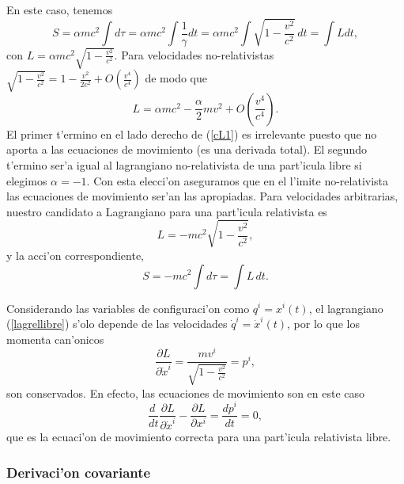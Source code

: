 En este caso, tenemos
\begin{equation}
S=\alpha mc^2\int  d\tau=\alpha mc^2\int \frac{1}{\gamma}dt=\alpha mc^2\int
\sqrt{1-\frac{v^2}{c^2}}\,dt=\int L dt, \label{lagrellibre0}
\end{equation}
con $L=\alpha mc^2 \sqrt{1-\frac{v^2}{c^2}}$.
Para velocidades no-relativistas $\sqrt{1-\frac{v^2}{c^2}}=1-\frac{v^2}{2c^2}+O(\frac{v^4}{c^4})$  de modo que
\begin{equation}
L=\alpha mc^2-\frac{\alpha}{2}mv^2+O(\frac{v^4}{c^4}). \label{cL1}
\end{equation}
El primer t'ermino en el lado derecho de (\ref{cL1}) es irrelevante puesto que no aporta a las ecuaciones de movimiento (es una derivada total). El segundo t'ermino ser'a igual al lagrangiano no-relativista de una part'icula libre si elegimos $\alpha=-1$. Con esta elecci'on aseguramos que en el l'imite no-relativista las ecuaciones de movimiento ser'an las apropiadas. Para velocidades arbitrarias, nuestro candidato a Lagrangiano para una part'icula relativista es
\begin{equation}
L=-mc^2 \sqrt{1-\frac{v^2}{c^2}},\label{lagrellibre}
\end{equation}
y la acci'on correspondiente,
\begin{equation}
\boxed{S=- mc^2\int  d\tau=\int L\, dt.}
\end{equation}

Considerando las variables de configuraci'on como $q^i=x^i(t)$, el lagrangiano (\ref{lagrellibre}) s'olo depende de las velocidades $\dot{q}^i=\dot{x}^i(t)$, por lo que los momenta can'onicos
\begin{equation}
\frac{\partial L}{\partial \dot{x}^i}=\frac{mv^i}{\sqrt{1-\frac{v^2}{c^2}}}=p^i,
\end{equation}
son conservados. En efecto, las ecuaciones de movimiento son en este caso
\begin{equation}
\frac{d\ }{dt}\frac{\partial L}{\partial \dot{x}^i}-\frac{\partial L}{\partial x^i}=\frac{d p^i}{dt} =0,
\end{equation}
que es la ecuaci'on de movimiento correcta para una part'icula relativista
libre.

\subsubsection{Derivaci'on covariante}

